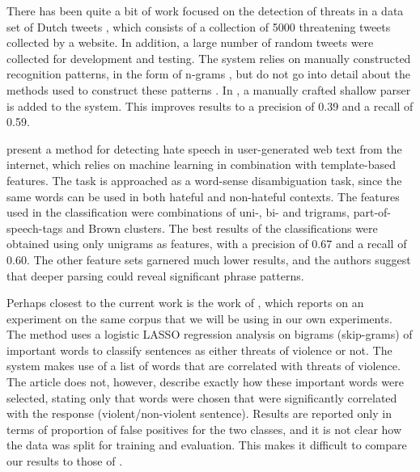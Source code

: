 \documentclass[11pt,letterpaper]{article}
\newcommand{\tovs}{threats of violence}
\begin{document}
There has been quite a bit of work focused on the detection of threats in a data set of Dutch tweets \cite{nellngram2013,nellshallow2013}, which consists of a collection of 5000 threatening tweets collected by a website. In addition, a large number of random tweets were collected for development and testing. %
The system relies on manually constructed recognition patterns, in the form of n-grams 
, but do not go into detail about the methods used to construct these patterns%
. In , a manually crafted shallow parser is added to the system. This improves results to a precision of 0.39 and a recall of 0.59.

 present a method for detecting hate speech in user-generated web text from the internet, which relies on machine learning in combination with template-based features. The task is approached as a word-sense disambiguation task, since the same words can be used in both hateful and non-hateful contexts. The features used in the classification were combinations of uni-, bi- and trigrams, part-of-speech-tags and Brown clusters.  The best results of the classifications were obtained using only unigrams as features, with a precision of 0.67 and a recall of 0.60. The other feature sets garnered much lower results, and the authors suggest that deeper parsing could reveal significant phrase patterns.

Perhaps closest to the current work is the work of , which reports on an experiment on the same corpus that we will be using in our own experiments. The method uses a logistic LASSO regression analysis on bigrams (skip-grams) of important words to classify sentences as either \tovs{} or not.  The system makes use of a list of words that are correlated with threats of violence. The article does not, however, describe exactly how these important words were selected, stating only that words were chosen that were significantly correlated with the response (violent/non-violent sentence). Results are reported only in terms of proportion of false positives for the two classes, and it is not clear how the data was split for training and evaluation. This makes it difficult to compare our results to those of .
\end{document}

